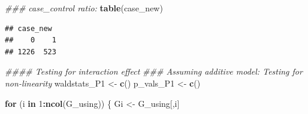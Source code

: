 \documentclass[
]{article}
\newenvironment{Shaded}{\begin{snugshade}}{\end{snugshade}}
\newcommand{\CommentTok}[1]{\textcolor[rgb]{0.56,0.35,0.01}{\textit{#1}}}
\newcommand{\ControlFlowTok}[1]{\textcolor[rgb]{0.13,0.29,0.53}{\textbf{#1}}}
\newcommand{\DecValTok}[1]{\textcolor[rgb]{0.00,0.00,0.81}{#1}}
\newcommand{\KeywordTok}[1]{\textcolor[rgb]{0.13,0.29,0.53}{\textbf{#1}}}
\newcommand{\NormalTok}[1]{#1}
\newcommand{\OperatorTok}[1]{\textcolor[rgb]{0.81,0.36,0.00}{\textbf{#1}}}
\newcommand{\StringTok}[1]{\textcolor[rgb]{0.31,0.60,0.02}{#1}}
\begin{document}
\begin{Shaded}
\begin{Highlighting}[]
\CommentTok{### case_control ratio: }
\KeywordTok{table}\NormalTok{(case_new)}
\end{Highlighting}
\end{Shaded}

\begin{verbatim}
## case_new
##    0    1 
## 1226  523
\end{verbatim}

\begin{Shaded}
\begin{Highlighting}[]
\CommentTok{#### Testing for interaction effect}
\CommentTok{### Assuming additive model: Testing for non-linearity}
\NormalTok{waldstats_P1 <-}\StringTok{ }\KeywordTok{c}\NormalTok{()}
\NormalTok{p_vals_P1 <-}\StringTok{ }\KeywordTok{c}\NormalTok{()}

\ControlFlowTok{for}\NormalTok{ (i }\ControlFlowTok{in} \DecValTok{1}\OperatorTok{:}\KeywordTok{ncol}\NormalTok{(G_using)) \{}
\NormalTok{  Gi <-}\StringTok{ }\NormalTok{G_using[,i]}
  

\end{Highlighting}
\end{Shaded}
\end{document}
